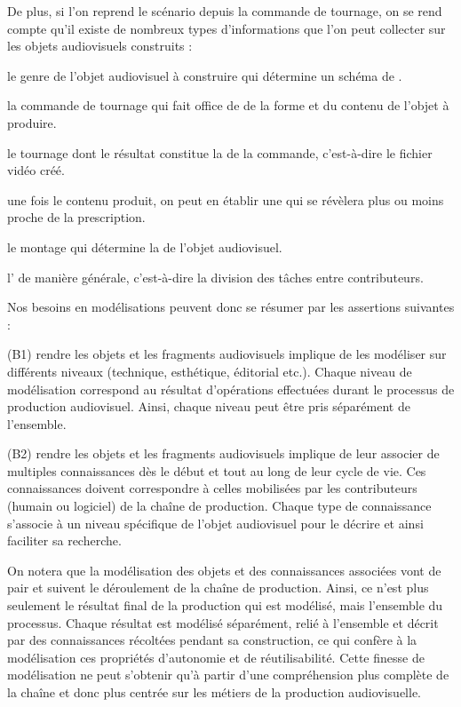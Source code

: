 De plus, si l'on reprend le scénario depuis la commande de tournage, on se rend compte qu'il existe de nombreux types d'informations que l'on peut collecter sur les objets audiovisuels construits :
\begin{liste}
	\item le genre de l'objet audiovisuel à construire qui détermine un schéma de . 
	\item la commande de tournage qui fait office de  de la forme et du contenu de l'objet à produire.
	\item le tournage dont le résultat constitue la  de la commande, c'est-à-dire le fichier vidéo créé.
	\item une fois le contenu produit, on peut en établir une  qui se révèlera plus ou moins proche de la prescription.
	\item le montage qui détermine la  de l'objet audiovisuel.
	\item l' de manière générale, c'est-à-dire la division des tâches entre contributeurs. 
\end{liste}

Nos besoins en modélisations peuvent donc se résumer par les assertions suivantes : 
\begin{liste}
	\item[(B1)] rendre les objets et les fragments audiovisuels  implique de les modéliser sur différents niveaux (technique, esthétique, éditorial etc.). 
	Chaque niveau de modélisation correspond au résultat d'opérations effectuées durant le processus de production audiovisuel.
	Ainsi, chaque niveau peut être pris séparément de l'ensemble.

	\item[(B2)] rendre les objets et les fragments audiovisuels  implique de leur associer de multiples connaissances dès le début et tout au long de leur cycle de vie.
	Ces connaissances doivent correspondre à celles mobilisées par les contributeurs (humain ou logiciel) de la chaîne de production.
	Chaque type de connaissance s'associe à un niveau spécifique de l'objet audiovisuel pour le décrire et ainsi faciliter sa recherche.

\end{liste}

On notera que la modélisation des objets et des connaissances associées vont de pair et suivent le déroulement de la chaîne de production.
Ainsi, ce n'est plus seulement le résultat final de la production qui est modélisé, mais l'ensemble du processus.
Chaque résultat est modélisé séparément, relié à l'ensemble et décrit par des connaissances récoltées pendant sa construction, ce qui confère à la modélisation ces propriétés d'autonomie et de réutilisabilité.
Cette finesse de modélisation ne peut s'obtenir qu'à partir d'une compréhension plus complète de la chaîne et donc plus centrée sur les métiers de la production audiovisuelle. 